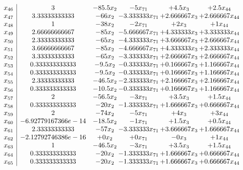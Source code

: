 \documentclass[11pt]{article}
\begin{document}
\[\begin{array}{c| c c@{\hskip 2pt} c@{\hskip 2pt} c@{\hskip 2pt} c@{\hskip 2pt} }
 x_{46}   &  3 & -85.5 x_{2} & -5 x_{71} & + 4.5 x_{3} & + 2.5 x_{44}\\
 x_{47}   &  3.33333333333 & -66 x_{2} & -3.333333 x_{71} & + 2.666667 x_{3} & + 2.666667 x_{44}\\
 x_{48}   &  1 & -38 x_{2} & -2 x_{71} & + 2 x_{3} & + 1 x_{44}\\
 x_{49}   &  2.66666666667 & -85 x_{2} & -5.666667 x_{71} & + 4.333333 x_{3} & + 3.333333 x_{44}\\
 x_{50}   &  2.33333333333 & -65 x_{2} & -4.333333 x_{71} & + 3.666667 x_{3} & + 2.666667 x_{44}\\
 x_{51}   &  3.66666666667 & -85 x_{2} & -4.666667 x_{71} & + 4.333333 x_{3} & + 2.333333 x_{44}\\
 x_{52}   &  3.33333333333 & -65 x_{2} & -3.333333 x_{71} & + 2.666667 x_{3} & + 2.666667 x_{44}\\
 x_{53}   &  0.333333333333 & -9.5 x_{2} & -0.333333 x_{71} & + 0.166667 x_{3} & + 1.166667 x_{44}\\
 x_{54}   &  0.333333333333 & -9.5 x_{2} & -0.333333 x_{71} & + 0.166667 x_{3} & + 1.166667 x_{44}\\
 x_{55}   &  2.33333333333 & -46.5 x_{2} & -2.333333 x_{71} & + 2.166667 x_{3} & + 2.166667 x_{44}\\
 x_{56}   &  0.333333333333 & -10.5 x_{2} & -0.333333 x_{71} & + 0.166667 x_{3} & + 1.166667 x_{44}\\
 x_{57}   &  2 & -56.5 x_{2} & -3 x_{71} & + 3.5 x_{3} & + 1.5 x_{44}\\
 x_{58}   &  0.333333333333 & -20 x_{2} & -1.333333 x_{71} & + 1.666667 x_{3} & + 0.666667 x_{44}\\
 x_{59}   &  2 & -74 x_{2} & -5 x_{71} & + 4 x_{3} & + 3 x_{44}\\
 x_{60}   &  -6.92779167366e-14 & -18.5 x_{2} & -1 x_{71} & + 1.5 x_{3} & + 0.5 x_{44}\\
 x_{61}   &  2.33333333333 & -57 x_{2} & -3.333333 x_{71} & + 3.666667 x_{3} & + 1.666667 x_{44}\\
 x_{62}   &  -2.12792746386e-16 & + 0 x_{2} & + 0 x_{71} & -0 x_{3} & + 1 x_{44}\\
 x_{63}   &  1 & -46.5 x_{2} & -3 x_{71} & + 3.5 x_{3} & + 1.5 x_{44}\\
 x_{64}   &  0.333333333333 & -20 x_{2} & -1.333333 x_{71} & + 1.666667 x_{3} & + 0.666667 x_{44}\\
 x_{65}   &  0.333333333333 & -20 x_{2} & -1.333333 x_{71} & + 1.666667 x_{3} & + 0.666667 x_{44}\\

\end{array}\]
\end{document}
